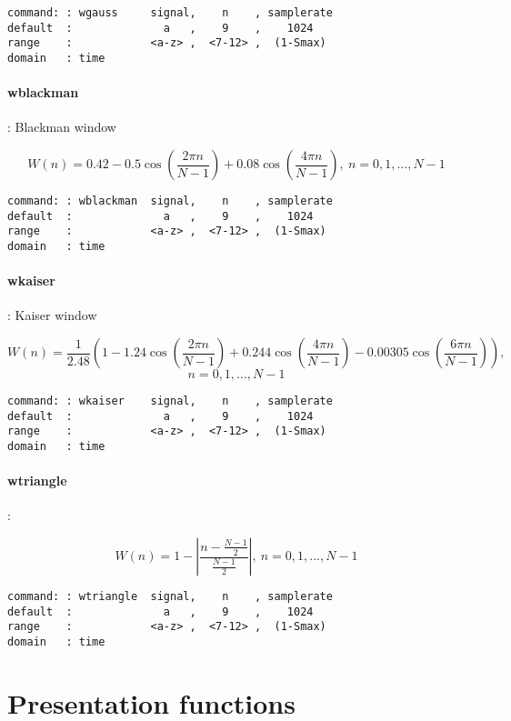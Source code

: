 \documentclass{report}
\newcommand{\bc}{\scriptsize}
\newcommand{\ec}{\normalsize}
\begin{document}
\bc
\begin{verbatim}
command: : wgauss     signal,    n    , samplerate
default  :              a   ,    9    ,    1024
range    :            <a-z> ,  <7-12> ,  (1-Smax)
domain   : time
\end{verbatim}
\ec

\paragraph{wblackman}: Blackman window

\[ W(n) = 0.42 - 0.5\cos (\frac{2\pi n}{N-1}) + 0.08\cos (\frac{4\pi n}{N-1}),~ n = 0,1,...,N-1 \]

\bc
\begin{verbatim}
command: : wblackman  signal,    n    , samplerate
default  :              a   ,    9    ,    1024
range    :            <a-z> ,  <7-12> ,  (1-Smax)
domain   : time
\end{verbatim}
\ec

\paragraph{wkaiser}: Kaiser window

\[ W(n) = \frac{1}{2.48} \left( 1- 1.24\cos (\frac{2\pi n}{N-1}) + 0.244\cos (\frac{4\pi n}{N-1}) - 0.00305\cos (\frac{6\pi n}{N-1}) \right),\]
\[ n = 0,1,...,N-1  \]


\bc
\begin{verbatim}
command: : wkaiser    signal,    n    , samplerate
default  :              a   ,    9    ,    1024
range    :            <a-z> ,  <7-12> ,  (1-Smax)
domain   : time
\end{verbatim}
\ec

\paragraph{wtriangle}:

\[ W(n) = 1 - \left|  \frac{n-\frac{N-1}{2}}{\frac{N-1}{2}} \right| ,~ n = 0,1,...,N-1 \]

\bc
\begin{verbatim}
command: : wtriangle  signal,    n    , samplerate
default  :              a   ,    9    ,    1024
range    :            <a-z> ,  <7-12> ,  (1-Smax)
domain   : time
\end{verbatim}
\ec

\section{Presentation functions}
\end{document}
